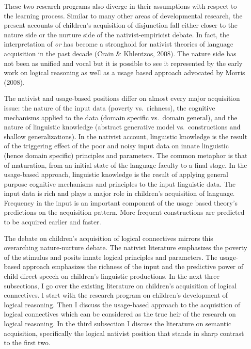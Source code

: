 \documentclass[oneside]{report}
\theoremstyle{definition}
\theoremstyle{definition}
\theoremstyle{definition}
\theoremstyle{remark}
\begin{document}
These two research programs also diverge in their assumptions with
respect to the learning process. Similar to many other areas of
developmental research, the present accounts of children's acquisition
of disjunction fall either closer to the nature side or the nurture side
of the nativist-empiricist debate. In fact, the interpretation of
\emph{or} has become a stronghold for nativist theories of language
acquisition in the past decade (Crain \& Khlentzos, 2008). The nature
side has not been as unified and vocal but it is possible to see it
represented by the early work on logical reasoning as well as a usage
based approach advocated by Morris (2008).

The nativist and usage-based positions differ on almost every major
acquisition issue: the nature of the input data (poverty vs.~richness),
the cognitive mechanisms applied to the data (domain specific vs.~domain
general), and the nature of linguistic knowledge (abstract generative
model vs.~constructions and shallow generalizations). In the nativist
account, linguistic knowledge is the result of the triggering effect of
the poor and noisy input data on innate linguistic (hence domain
specific) principles and parameters. The common metaphor is that of
maturation, from an initial state of the language faculty to a final
stage. In the usage-based approach, linguistic knowledge is the result
of applying general purpose cognitive mechanisms and principles to the
input linguistic data. The input data is rich and plays a major role in
children's acquisition of language. Frequency in the input is an
important component of the usage based theory's predictions on the
acquisition pattern. More frequent constructions are predicted to be
acquired earlier and faster.

The debate on children's acquisition of logical connectives mirrors this
overarching nature-nurture debate. The nativist literature emphasizes
the poverty of the stimulus and posits innate logical principles and
parameters. The usage-based approach emphasizes the richness of the
input and the predictive power of child direct speech on children's
linguistic productions. In the next three subsections, I go over the
existing literature on children's acquisition of logical connectives. I
start with the research program on children's development of logical
reasoning. Then I discuss the usage-based approach to the acquisition of
logical connectives which can be considered as the true heir of the
research on logical reasoning. In the third subsection I discuss the
literature on semantic acquisition, specifically the logical nativist
position that stands in sharp contrast to the first two.
\end{document}
